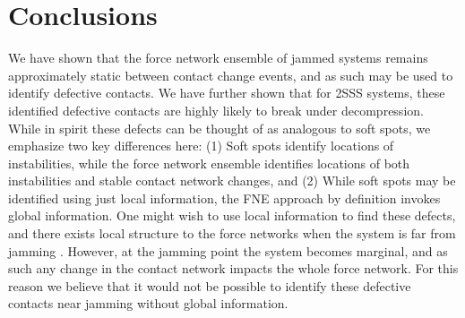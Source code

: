 









\section{Conclusions}

We have shown that the force network ensemble of jammed systems remains approximately static between contact change events, and as such may be used to identify defective contacts. We have further shown that for 2SSS systems, these identified defective contacts are highly likely to break under decompression. While in spirit these defects can be thought of as analogous to soft spots, we emphasize two key differences here: (1) Soft spots identify locations of instabilities, while the force network ensemble identifies locations of both instabilities and stable contact network changes, and (2) While soft spots may be identified using just local information, the FNE approach by definition invokes global information. One might wish to use local information to find these defects, and there exists local structure to the force networks when the system is far from jamming \cite{sussman_spatial_2016}. However, at the jamming point the system becomes marginal, and as such any change in the contact network impacts the whole force network. For this reason we believe that it would not be possible to identify these defective contacts near jamming without global information. 

